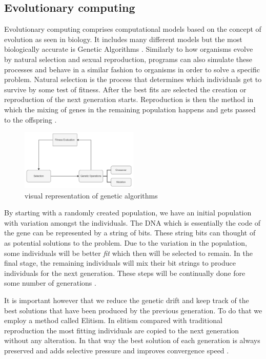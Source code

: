 \subsection{Evolutionary computing}
Evolutionary computing comprises computational models based on the concept of evolution as seen in biology. It includes many different models but the most biologically accurate is Genetic Algorithms \cite{drugan2019reinforcement} . Similarly to how organisms evolve by natural selection and sexual reproduction, programs can also simulate these processes and behave in a similar fashion to organisms in order to solve a specific problem. Natural selection is the process that determines which individuals get to survive by some test of fitness. After the best fits are selected the creation or reproduction of the next generation starts. Reproduction is then the method in which the mixing of genes in the remaining population happens and gets passed to the offspring \cite{holland1992genetic}.
\begin{figure}[H]
    \centering
    \includegraphics [width=0.5\textwidth]{Images/GA_graph.png}
    \caption{visual representation of genetic algorithms}
    \label{figGA}
\end{figure}

By starting with a randomly created population, we have an initial population with variation amongst the individuals. The DNA which is essentially the code of the gene can be represented by a string of bits. These string bits can thought of as potential solutions to the problem. Due to the variation in the population, some individuals will be better \textit{fit} which then will be selected to remain. In the final stage, the remaining individuals will mix their bit strings to produce individuals for the next generation. These steps will be continually done fore some number of generations \cite{forrest1996genetic}. 

It is important however that we reduce the genetic drift and keep track of the best solutions that have been produced by the previous generation. To do that we employ a method called Elitism. In elitism compared with traditional reproduction the most fitting individuals are copied to the next generation without any alteration. In that way the best solution of each generation is always preserved and adds selective pressure and improves convergence speed \cite{du2018elitism}.

